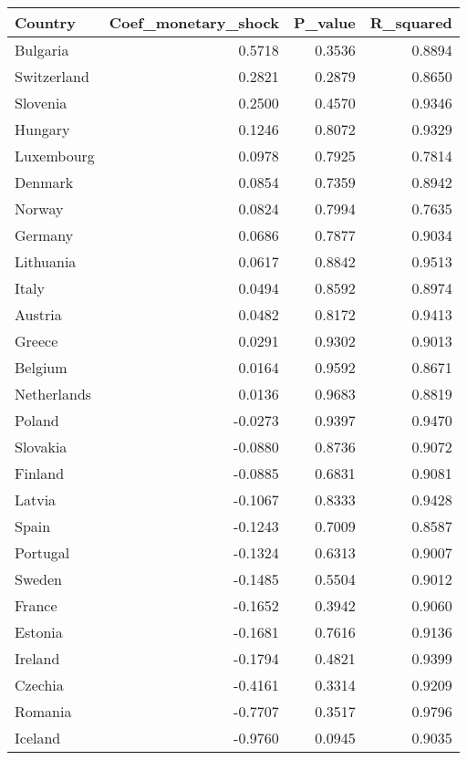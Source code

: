 \begin{tabular}{lrrr}
\toprule
Country & Coef_monetary_shock & P_value & R_squared \\
\midrule
Bulgaria & 0.5718 & 0.3536 & 0.8894 \\
Switzerland & 0.2821 & 0.2879 & 0.8650 \\
Slovenia & 0.2500 & 0.4570 & 0.9346 \\
Hungary & 0.1246 & 0.8072 & 0.9329 \\
Luxembourg & 0.0978 & 0.7925 & 0.7814 \\
Denmark & 0.0854 & 0.7359 & 0.8942 \\
Norway & 0.0824 & 0.7994 & 0.7635 \\
Germany & 0.0686 & 0.7877 & 0.9034 \\
Lithuania & 0.0617 & 0.8842 & 0.9513 \\
Italy & 0.0494 & 0.8592 & 0.8974 \\
Austria & 0.0482 & 0.8172 & 0.9413 \\
Greece & 0.0291 & 0.9302 & 0.9013 \\
Belgium & 0.0164 & 0.9592 & 0.8671 \\
Netherlands & 0.0136 & 0.9683 & 0.8819 \\
Poland & -0.0273 & 0.9397 & 0.9470 \\
Slovakia & -0.0880 & 0.8736 & 0.9072 \\
Finland & -0.0885 & 0.6831 & 0.9081 \\
Latvia & -0.1067 & 0.8333 & 0.9428 \\
Spain & -0.1243 & 0.7009 & 0.8587 \\
Portugal & -0.1324 & 0.6313 & 0.9007 \\
Sweden & -0.1485 & 0.5504 & 0.9012 \\
France & -0.1652 & 0.3942 & 0.9060 \\
Estonia & -0.1681 & 0.7616 & 0.9136 \\
Ireland & -0.1794 & 0.4821 & 0.9399 \\
Czechia & -0.4161 & 0.3314 & 0.9209 \\
Romania & -0.7707 & 0.3517 & 0.9796 \\
Iceland & -0.9760 & 0.0945 & 0.9035 \\
\bottomrule
\end{tabular}
